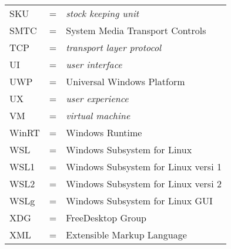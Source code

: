 \begin{tabular}{llp{3in}}
    SKU & \hspace{1.5cm} = & \textit{stock keeping unit}\\
    SMTC & \hspace {1.5cm} = & System Media Transport Controls\\
    TCP & \hspace{1.5cm} = & \textit{transport layer protocol}\\
    UI & \hspace{1.5cm} = & \textit{user interface}\\
    UWP & \hspace{1.5cm} = & Universal Windows Platform\\
    UX & \hspace{1.5cm} = & \textit{user experience}\\
    VM & \hspace{1.5cm} = & \textit{virtual machine}\\
    WinRT & \hspace{1.5cm} = & Windows Runtime\\
    WSL & \hspace{1.5cm} = & Windows Subsystem for Linux\\
    WSL1 & \hspace{1.5cm} = & Windows Subsystem for Linux versi 1\\
    WSL2 & \hspace{1.5cm} = & Windows Subsystem for Linux versi 2\\
    WSLg & \hspace{1.5cm} = & Windows Subsystem for Linux GUI\\
    XDG & \hspace{1.5cm} = & FreeDesktop Group\\
    XML & \hspace{1.5cm} = & Extensible Markup Language
\end{tabular}
